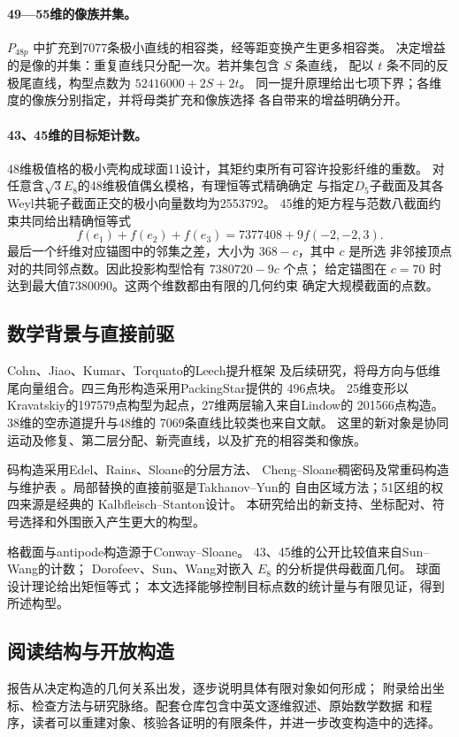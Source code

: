 \paragraph{49—55维的像族并集。}
$P_{48p}$ 中扩充到7077条极小直线的相容类，经等距变换产生更多相容类。
决定增益的是像的并集：重复直线只分配一次。若并集包含 $S$ 条直线，
配以 $t$ 条不同的反极尾直线，构型点数为 $52416000+2S+2t$。
同一提升原理给出七项下界；各维度的像族分别指定，并将母类扩充和像族选择
各自带来的增益明确分开。

\paragraph{43、45维的目标矩计数。}
48维极值格的极小壳构成球面11设计，其矩约束所有可容许投影纤维的重数。
对任意含$\sqrt3E_8$的48维极值偶幺模格，有理恒等式精确确定
与指定$D_5$子截面及其各Weyl共轭子截面正交的极小向量数均为2553792。
45维的矩方程与范数八截面约束共同给出精确恒等式
\[
f(e_1)+f(e_2)+f(e_3)=7377408+9f(-2,-2,3).
\]
最后一个纤维对应锚图中的邻集之差，大小为 $368-c$，其中 $c$ 是所选
非邻接顶点对的共同邻点数。因此投影构型恰有 $7380720-9c$ 个点；
给定锚图在 $c=70$ 时达到最大值7380090。这两个维数都由有限的几何约束
确定大规模截面的点数。

\subsection{数学背景与直接前驱}

Cohn、Jiao、Kumar、Torquato的Leech提升框架\cite[定理7.5]{cjkt}
及后续研究，将母方向与低维尾向量组合。四三角形构造采用PackingStar提供的
496点块\cite{packingstar,packingstar-data}。
25维变形以Kravatskiy的197579点构型为起点，27维两层输入来自Lindow的
201566点构造\cite{kissingnumbers,lindow27}。38维的空赤道提升与48维的
7069条直线比较类也来自文献\cite{kissingnumbers}。
这里的新对象是协同运动及修复、第二层分配、新壳直线，以及扩充的相容类和像族。

码构造采用Edel、Rains、Sloane的分层方法\cite{ers}、
Cheng--Sloane稠密码\cite{chengsloane}及常重码构造与维护表
\cite{bsss,brouwer,echols}。局部替换的直接前驱是Takhanov--Yun的
自由区域方法\cite[第V节]{signed-johnson}；51区组的权四来源是经典的
Kalbfleisch--Stanton设计\cite{kalbfleisch-stanton}。
本研究给出的新支持、坐标配对、符号选择和外围嵌入产生更大的构型。

格截面与antipode构造源于Conway--Sloane\cite{laminated,antipode}。
43、45维的公开比较值来自Sun--Wang的计数\cite{sunwang-sections,crosssections}；
Dorofeev、Sun、Wang对嵌入 $E_8$ 的分析\cite{dorofeev}提供母截面几何。
球面设计理论\cite{dgs,nebe-designs}给出矩恒等式；
本文选择能够控制目标点数的统计量与有限见证，得到所述构型。

\subsection{阅读结构与开放构造}

报告从决定构造的几何关系出发，逐步说明具体有限对象如何形成；
附录给出坐标、检查方法与研究脉络。配套仓库包含中英文逐维叙述、原始数学数据
和程序，读者可以重建对象、核验各证明的有限条件，并进一步改变构造中的选择。
